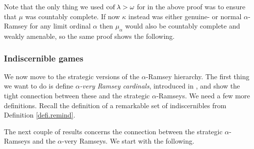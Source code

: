 \documentclass[../../main]{subfiles}
\begin{document}
Note that the only thing we used $\operatorname{cof}\lambda>\omega$ for in the above proof was to ensure that $\mu$ was countably complete. If now $\kappa$ instead was either genuine- or normal $\alpha$-Ramsey for any limit ordinal $\alpha$ then $\mu_\alpha$ would also be countably complete and weakly amenable, so the same proof shows the following.



\subsubsection{Indiscernible games}

We now move to the strategic versions of the $\alpha$-Ramsey hierarchy. The first thing we want to do is define \textit{$\alpha$-very Ramsey cardinals}, introduced in \cite{SharpeWelch}, and show the tight connection between these and the strategic $\alpha$-Ramseys. We need a few more definitions. Recall the definition of a remarkable set of indiscernibles from Definition \ref{defi.remind}.




The next couple of results concerns the connection between the strategic $\alpha$-Ramseys and the $\alpha$-very Ramseys. We start with the following.
\end{document}
